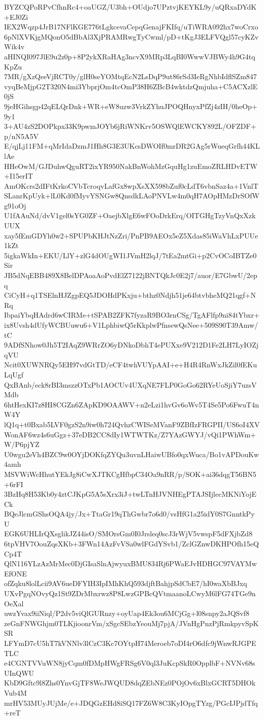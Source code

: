 BYZCQPoRPvCfhnRc4+oaUGZ/U3bh+OUdjo7UPztvjKEYKL9y/uQRxaDYdK+EJ0Zi
IEX2Wqzp4JrB17NFlKGE776tLgkcevaCepqGenajFKIfq/uTiWRA092hx7woCrxo
6pNlXVKjgMQonO5dBbAl3XjPRAMRwgTyCwml/pD+tKgJ3ELFVQgl57cyKZvWik4v
aHINQI097JlE9u2z0p+8P2ykXRaHAg3ncvX9MRp3LqBI0WwwVJBWy4h9G4tqKpZu
7MR/gXzQeeVjRCT0y/glH0seYOMtqEcN2LsDqP9ut86rSd3IeRgNhbIdflSZm847
vyqBeMjpG2T320N4mi3YbprjOm4tcOmP38H6ZBcB4wktdzQmjuha+C5ACXzlE0jS
9jeHGihsgp42qELQrDnk+WR+eW8uzw3VrkZYhuJPOQHnyxPfZj4zIH/0heOp+9y1
3+AU4zS2DOPkpx33K9pwmJOYb6jRiWNKrv5OSWQlEWCKY892L/OFZDF+p/nN5A5V
E/qjLj11FM+qMrIdaDzmJ1Hh8G3E3UKcsDWOIf0mrDR2GAg5rWueqGrfh44KLlAe
HHeOwM/GJDuhwQguRT2ixYR950NakBnWohMzGquHg1zuEmoZRLHDvETW+I15erIT
AmOKcrs2dIFtKrkoCVbTcroqvLafGx8wpXsXX598bZuf0cLdT6vbnSaz4a+1VnlT
SLanrKpUyk+lL0Kd0fMyvYSNGw8QnsdkLAoPNVLw4m0qH7AOpHMzDrSOfWg91oOj
U1fAAuNd/dvV1gel0sYG0ZF+OaejbXlgE6wFOoDrkErq/OITGHgTzyVnQxXzkUUX
xay5fEmGDYh0w2+SPUPbKHJtNzZri/PnPB9AEOx5eZ5Xdas85iWaVhLxPUUe1kZt
5igkaWkIn+EKU/LlY+zlG4dOUgWI1JVmH2lqJ/7tEa2mtGi+p2CvOCoIBTZe0Sir
JB5dNqEBB489X8BelDPAoaAoPvdElZ7122jBNTQkJc0E2j7/auor/E7GbwU/2epq
CiCyH+q1TSElnHJZgpEQ5JDOHdPKxju+bthz0Ndjh51je64btvbheMQ21qgf+NRq
IbpaiYbqHAdrd6wCIRMe+tSPAB2ZFK7fyzaR9BO3rnCSg/TgAFlfp9ni84tYbxr+
ix8Uvsh4dUfyWCBUuwu6+V1LphbiwQ5rKkplwPfnsewQsNee+509S90T39Amw/tC
9ADfSNhow0Jh5T2IAqZ9WRrZO6yDNkoDbhT4ePUXxe9V212D1Fe2LH7LyIOZjqVU
Ncit0XUWNRQy5EH97vdGtTD/eCF4twhVUYpAAI+e+H4R4RnWxJkZil0fEKuLqUgf
QxBAnb/eck8rBI3mszzOTxPb1AOCUv4UXqNE7FLP0GoGo62RYeUoSjiY7uzsVMdb
6htHexKI7z8HI8CGZn6ZApKD9OAAWV+n2eLzi1hvGv6oWv5T4Se5Po6FwuT4nW4Y
lQ1q+t0Bxab5LVF0gzS2n9iw0h724QvhzCWISeMVanF9ZBfIzFRGPII/US6oI4XV
WonAF6wz4s6uGgz+37eDB2CC8dIy1WTWTKz/Z7YAzGWYJ/vQi1PWhWm+W/P6pjYZ
U0wgu2eVh4BZC9w0OYjDOKfqZYQu3uvnLHaiwUBfo0qxWuca/Bo1vAPDouKw4amh
MSVWiWcHhutYEkJg8iCwXJTKCgHfbpC34Oa9nRR/p/SOK+ai36dqgT56BN5+6rFI
3BzHq8H53Kb0y4ztCJKpG5A5sXrx3iJ+twLTnHJVNHEgPTAJSIjlecMKNiYojECk
BQeJlcmGShsOQA4jy/Jx+TtaGr19qThGwbr7o6d0/vsHfG1a25idY0S7GnntkPyU
EGK6UHLIrQXsglikJZ44isO/SMOrsGm0I0Jrsleq0scJ3rWjV5vwspF5dFXjbZd8
6tpVHV7OouZqsXKb+3FWn14AzFvVSa0wlFGdYSvb1/ZclGZnwDKHPOfh15eQCp4T
QlN116YLzAzMrMec0DjGIsaSlnAjwyuxBMU834Rj6PWaEJvHDHGC97VAYMwEfONE
ofZqku8lolLcii9AV6ueDFYIH3IpIMhKhQ593djftBahjpSdCbE7/hI0waXbBJxq
UXvPgqNOvyQz1St9ZDrMbxrwz8P8LwzGPBcQVtmaanoLCwyM6lFG74TGe9nOeXal
uwzYvax9iiNiql/P2dv5viQlGURnzy+oyUap4Ek3ou6MCjGg+l08snpy2aJQSvf8
zeGnFNWGhjm0TLKjioonrVm/xSgcSEbzYeouMj7pjA/JVnHgPnzPjRmkpyvSpKSR
LFYmD7cU5hT7kVNNlv3lCzC3Kc7OYtpH74Meroeb7oDI4rO6dfc9jWnwRJGPETLC
e4CGNTVVuWN8jyCqm0fDMpHWgFRSg6V0ql3JuKcpSkR0OpplbF+NVNv68sUInQWU
KbD9Gftc9l8Zhs0YnvGjTF8WeJWQUD8dqZEbNEz0POjOv6xBlxGCRT5DHOkVub4M
mrHV53MUyJUjMe/e+JDQGzEHd8iSQ17FZ6W8C3KyIOpgTYzg/PGcIJPjdTfq+reT
